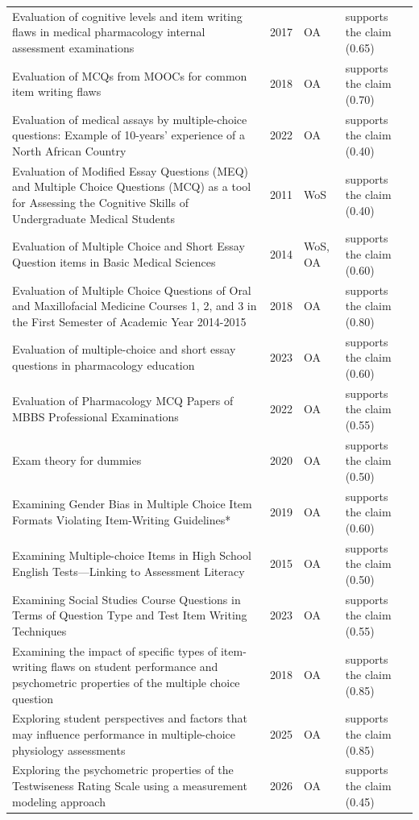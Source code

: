 \begin{longtable}{@{}%
  >{\raggedright\arraybackslash}p{}c%
  >{\raggedright\arraybackslash}p{}%
  >{\raggedright\arraybackslash}p{}@{}}
Evaluation of cognitive levels and item writing flaws in medical pharmacology internal assessment examinations & 2017 & OA & supports the claim (0.65) \\
Evaluation of MCQs from MOOCs for common item writing flaws & 2018 & OA & supports the claim (0.70) \\
Evaluation of medical assays by multiple-choice questions: Example of 10-years' experience of a North African Country & 2022 & OA & supports the claim (0.40) \\
Evaluation of Modified Essay Questions (MEQ) and Multiple Choice Questions (MCQ) as a tool for Assessing the Cognitive Skills of Undergraduate Medical Students & 2011 & WoS & supports the claim (0.40) \\
Evaluation of Multiple Choice and Short Essay Question items in Basic Medical Sciences & 2014 & WoS, OA & supports the claim (0.60) \\
Evaluation of Multiple Choice Questions of Oral and Maxillofacial Medicine Courses 1, 2, and 3 in the First Semester of Academic Year 2014-2015 & 2018 & OA & supports the claim (0.80) \\
Evaluation of multiple-choice and short essay questions in pharmacology education & 2023 & OA & supports the claim (0.60) \\
Evaluation of Pharmacology MCQ Papers of MBBS Professional Examinations & 2022 & OA & supports the claim (0.55) \\
Exam theory for dummies & 2020 & OA & supports the claim (0.50) \\
Examining Gender Bias in Multiple Choice Item Formats Violating Item-Writing Guidelines* & 2019 & OA & supports the claim (0.60) \\
Examining Multiple-choice Items in High School English Tests---Linking to Assessment Literacy & 2015 & OA & supports the claim (0.50) \\
Examining Social Studies Course Questions in Terms of Question Type and Test Item Writing Techniques & 2023 & OA & supports the claim (0.55) \\
Examining the impact of specific types of item-writing flaws on student performance and psychometric properties of the multiple choice question & 2018 & OA & supports the claim (0.85) \\
Exploring student perspectives and factors that may influence performance in multiple-choice physiology assessments & 2025 & OA & supports the claim (0.85) \\
Exploring the psychometric properties of the Testwiseness Rating Scale using a measurement modeling approach & 2026 & OA & supports the claim (0.45) \\

\end{longtable}
